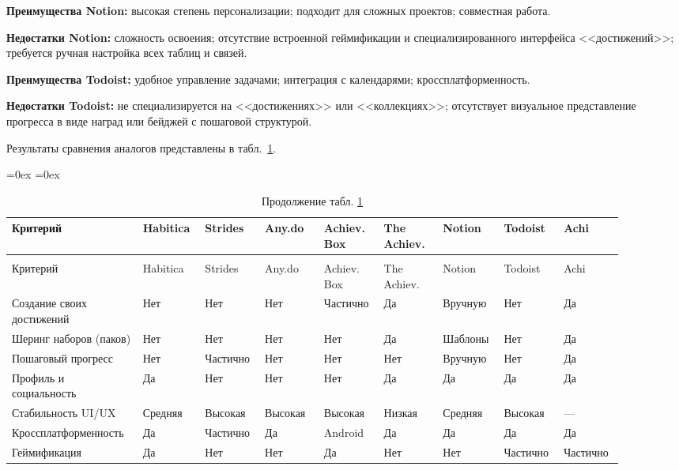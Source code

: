 \documentclass[../main.tex]{subfiles}
\begin{document}
\textbf{Преимущества Notion:} высокая степень персонализации; подходит для сложных проектов; совместная работа.

\textbf{Недостатки Notion:} сложность освоения; отсутствие встроенной геймификации и специализированного интерфейса <<достижений>>; требуется ручная настройка всех таблиц и связей.

\textbf{Преимущества Todoist:} удобное управление задачами; интеграция с календарями; кроссплатформенность.

\textbf{Недостатки Todoist:} не специализируется на <<достижениях>> или <<коллекциях>>; отсутствует визуальное представление прогресса в виде наград или бейджей с пошаговой структурой.

Результаты сравнения аналогов представлены в табл.~\ref{tab:analogs-compare}.

\aboverulesep=0ex
\belowrulesep=0ex
\begin{small}
\begin{longtable}[t]{
	|>{\RaggedRight\arraybackslash}p{0.18\linewidth}|
	>{\centering\arraybackslash}p{0.09\linewidth}|
	>{\centering\arraybackslash}p{0.09\linewidth}|
	>{\centering\arraybackslash}p{0.09\linewidth}|
	>{\centering\arraybackslash}p{0.09\linewidth}|
	>{\centering\arraybackslash}p{0.09\linewidth}|
	>{\centering\arraybackslash}p{0.09\linewidth}|
	>{\centering\arraybackslash}p{0.09\linewidth}|
	>{\centering\arraybackslash}p{0.09\linewidth}|
}

\caption{Сравнительный анализ аналогов} \label{tab:analogs-compare}\\
\hline
Критерий & Habitica & Strides & Any.do & Achiev. Box & The Achiev. & Notion & Todoist & Achi \\
\hline
\endfirsthead

\caption*{Продолжение табл. \ref{tab:analogs-compare}\raggedleft}\\
\hline
Критерий & Habitica & Strides & Any.do & Achiev. Box & The Achiev. & Notion & Todoist & Achi \\
\hline
\endhead

\endfoot
\hline
\endlastfoot

Создание своих достижений & Нет & Нет & Нет & Частично & Да & Вручную & Нет & Да \\
\hline
Шеринг наборов (паков) & Нет & Нет & Нет & Нет & Да & Шаблоны & Нет & Да \\
\hline
Пошаговый прогресс & Нет & Частично & Нет & Нет & Нет & Вручную & Нет & Да \\
\hline
Профиль и социальность & Да & Нет & Нет & Нет & Да & Да & Да & Да \\
\hline
Стабильность UI/UX & Средняя & Высокая & Высокая & Высокая & Низкая & Средняя & Высокая & --- \\
\hline
Кросс\-плат\-фор\-мен\-ность & Да & Частично & Да & Android & Да & Да & Да & Да \\
\hline
Геймификация & Да & Нет & Нет & Да & Нет & Нет & Частично & Частично \\

\end{longtable}
\end{small}
\end{document}

